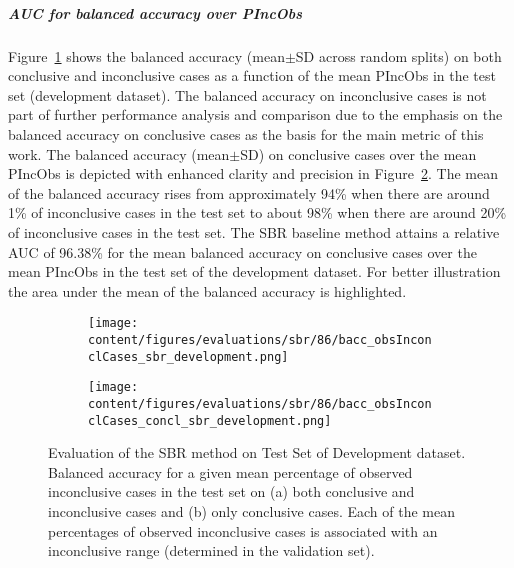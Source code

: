 \subparagraph{AUC for balanced accuracy over PIncObs}

Figure~\ref{fig:bacc_obsInconclCases_sbr_development} shows the balanced accuracy (mean$\pm$SD across random splits) 
on both conclusive and inconclusive cases as a function of the mean PIncObs
in the test set (development dataset).
The balanced accuracy on inconclusive cases is not part of further performance analysis and comparison 
due to the emphasis on the balanced accuracy on conclusive cases as the basis for the main metric of this work.
The balanced accuracy (mean$\pm$SD) on conclusive cases over the mean PIncObs
is depicted with enhanced clarity and precision in Figure~\ref{fig:bacc_obsInconclCases_concl_sbr_development}.
The mean of the balanced accuracy rises from approximately 94\% 
when there are around 1\% of inconclusive cases in the test set to about 98\% 
when there are around 20\% of inconclusive cases in the test set.
The SBR baseline method attains a relative AUC of 96.38\% for the mean balanced accuracy on conclusive cases
over the mean PIncObs in the test set of the development dataset.
For better illustration the area under the mean of the balanced accuracy is highlighted.

\begin{figure}[ht]
    \begin{subfigure}{0.9\textwidth}
      \centering
      \texttt{[image: content/figures/evaluations/sbr/86/bacc\_obsInconclCases\_sbr\_development.png]}
      \subcaption{}
      \label{fig:bacc_obsInconclCases_sbr_development}
    \end{subfigure}
    \hfill
    \begin{subfigure}{0.9\textwidth}
      \centering
      \texttt{[image: content/figures/evaluations/sbr/86/bacc\_obsInconclCases\_concl\_sbr\_development.png]}
      \subcaption{}
      \label{fig:bacc_obsInconclCases_concl_sbr_development}
    \end{subfigure}

    \caption{Evaluation of the SBR method on Test Set of Development dataset.
    Balanced accuracy for a given mean percentage of observed inconclusive cases in the test set on 
    (a) both conclusive and inconclusive cases and (b) only conclusive cases. 
    Each of the mean percentages of observed inconclusive cases is associated with an inconclusive range (determined in the validation set). }
    \label{fig:bacc_obsInconclCases_sbr_development_full}
\end{figure}

